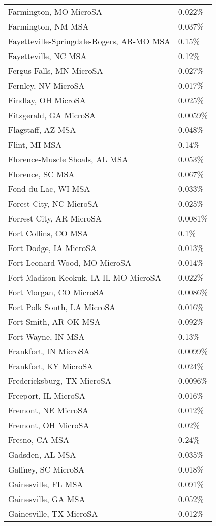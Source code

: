 \begin{longtable}[]{@{}ll@{}}
Farmington, MO MicroSA & 0.022\% \\
Farmington, NM MSA & 0.037\% \\
Fayetteville-Springdale-Rogers, AR-MO MSA & 0.15\% \\
Fayetteville, NC MSA & 0.12\% \\
Fergus Falls, MN MicroSA & 0.027\% \\
Fernley, NV MicroSA & 0.017\% \\
Findlay, OH MicroSA & 0.025\% \\
Fitzgerald, GA MicroSA & 0.0059\% \\
Flagstaff, AZ MSA & 0.048\% \\
Flint, MI MSA & 0.14\% \\
Florence-Muscle Shoals, AL MSA & 0.053\% \\
Florence, SC MSA & 0.067\% \\
Fond du Lac, WI MSA & 0.033\% \\
Forest City, NC MicroSA & 0.025\% \\
Forrest City, AR MicroSA & 0.0081\% \\
Fort Collins, CO MSA & 0.1\% \\
Fort Dodge, IA MicroSA & 0.013\% \\
Fort Leonard Wood, MO MicroSA & 0.014\% \\
Fort Madison-Keokuk, IA-IL-MO MicroSA & 0.022\% \\
Fort Morgan, CO MicroSA & 0.0086\% \\
Fort Polk South, LA MicroSA & 0.016\% \\
Fort Smith, AR-OK MSA & 0.092\% \\
Fort Wayne, IN MSA & 0.13\% \\
Frankfort, IN MicroSA & 0.0099\% \\
Frankfort, KY MicroSA & 0.024\% \\
Fredericksburg, TX MicroSA & 0.0096\% \\
Freeport, IL MicroSA & 0.016\% \\
Fremont, NE MicroSA & 0.012\% \\
Fremont, OH MicroSA & 0.02\% \\
Fresno, CA MSA & 0.24\% \\
Gadsden, AL MSA & 0.035\% \\
Gaffney, SC MicroSA & 0.018\% \\
Gainesville, FL MSA & 0.091\% \\
Gainesville, GA MSA & 0.052\% \\
Gainesville, TX MicroSA & 0.012\% \\

\end{longtable}
